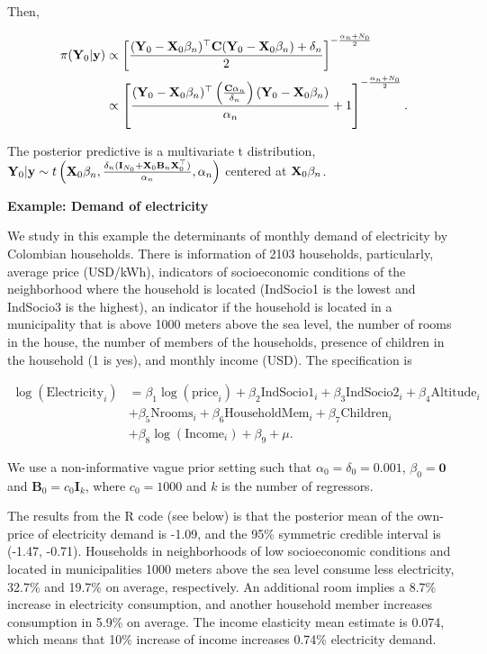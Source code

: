 Then,

\begin{align*}
	\pi({\bf{Y}}_0|{\bf{y}})&\propto\left[\frac{({\bf{Y}}_0-{\mathbf{X}}_0\beta_n)^{\top}{\bf{C}}({\bf{Y}}_0-{\mathbf{X}}_0\beta_n)+\delta_n}{2}\right]^{-\frac{\alpha_n+N_0}{2}}\\
	&\propto\left[\frac{({\bf{Y}}_0-{\mathbf{X}}_0\beta_n)^{\top}\left(\frac{{\bf{C}}\alpha_n}{\delta_n}\right)({\bf{Y}}_0-{\mathbf{X}}_0\beta_n)}{\alpha_n}+1\right]^{-\frac{\alpha_n+N_0}{2}}.
\end{align*}

The posterior predictive is a multivariate t distribution, ${\bf{Y}}_0|{\bf{y}}\sim t\left({\bf{X}}_0\beta_n,\frac{\delta_n({\bf{I}}_{N_0}+{\bf{X}}_0{\bf{B}}_n{\bf{X}}_0^{\top})}{\alpha_n},\alpha_n\right)$ centered at ${\bf{X}}_0\beta_n$.

\textbf{Example: Demand of electricity}

We study in this example the determinants of monthly demand of electricity by Colombian households. There is information of 2103 households, particularly, average price (USD/kWh), indicators of socioeconomic conditions of the neighborhood where the household is located (IndSocio1 is the lowest and IndSocio3 is the highest), an indicator if the household is located in a municipality that is above 1000 meters above the sea level, the number of rooms in the house, the number of members of the households, presence of children in the household (1 is yes), and monthly income (USD). The specification is

\begin{align*}
	\log(\text{Electricity}_i) & = \beta_1\log(\text{price}_i) + \beta_2\text{IndSocio1}_i + \beta_3\text{IndSocio2}_i + \beta_4\text{Altitude}_i \\
	& + \beta_5\text{Nrooms}_i + \beta_6\text{HouseholdMem}_i + \beta_7\text{Children}_i\\
	& + \beta_8\log(\text{Income}_i) + \beta_9 + \mu.
\end{align*}

We use a non-informative vague prior setting such that $\alpha_0=\delta_0=0.001$, $\beta_0=\mathbf{0}$ and $\mathbf{B}_0=c_0\mathbf{I}_k$, where $c_0=1000$ and $k$ is the number of regressors. 

The results from the R code (see below) is that the posterior mean of the own-price of electricity demand is -1.09, and the 95\% symmetric credible interval is (-1.47, -0.71). Households in neighborhoods of low socioeconomic conditions and located in municipalities 1000 meters above the sea level consume less electricity, 32.7\% and 19.7\% on average, respectively. An additional room implies a 8.7\% increase in electricity consumption, and another household member increases consumption in 5.9\% on average. The income elasticity mean estimate is 0.074, which means that 10\% increase of income increases 0.74\% electricity demand.

